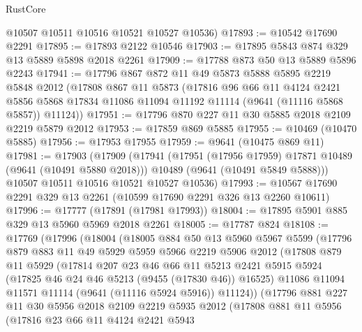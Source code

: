 \begin{lexlean}{RustCore}
\begin{coremodule}
      @10507
      @10511
      @10516
      @10521
      @10527
      @10536)
@17893 := @10542 @17690 @2291
@17895 := @17893 @2122 @10546
@17903 := @17895 @5843 @874 @329 @13 @5889 @5898 @2018 @2261
@17909 := @17788 @873 @50 @13 @5889 @5896 @2243
@17941 := @17796
    @867
    @872
    @11
    @49
    @5873
    @5888
    @5895
    @2219
    @5848
    @2012
    (@17808
      @867
      @11
      @5873
      (@17816
        @96
        @66
        @11
        @4124
        @2421
        @5856
        @5868
        @17834
        @11086
        @11094
        @11192
        @11114
        (@9641 (@11116 @5868 @5857))
        @11124))
@17951 := @17796 @870 @227 @11 @30 @5885 @2018 @2109 @2219 @5879 @2012
@17953 := @17859 @869 @5885
@17955 := @10469 (@10470 @5885)
@17956 := @17953 @17955
@17959 := @9641 (@10475 @869 @11)
@17981 := @17903
    (@17909
      (@17941
        (@17951 (@17956 @17959) @17871 @10489 (@9641 (@10491 @5880 @2018)))
        @10489
        (@9641 (@10491 @5849 @5888)))
      @10507
      @10511
      @10516
      @10521
      @10527
      @10536)
@17993 := @10567 @17690 @2291 @329 @13 @2261 (@10599 @17690 @2291 @326 @13 @2260 @10611)
@17996 := @17777 (@17891 (@17981 @17993))
@18004 := @17895 @5901 @885 @329 @13 @5960 @5969 @2018 @2261
@18005 := @17787 @824
@18108 := @17769
    (@17996
      (@18004
        (@18005
          @884
          @50
          @13
          @5960
          @5967
          @5599
          (@17796
            @879
            @883
            @11
            @49
            @5929
            @5959
            @5966
            @2219
            @5906
            @2012
            (@17808
              @879
              @11
              @5929
              (@17814
                @207
                @23
                @46
                @66
                @11
                @5213
                @2421
                @5915
                @5924
                (@17825 @46 @24 @46 @5213 (@9455 (@17830 @46)) @16525)
                @11086
                @11094
                @11571
                @11114
                (@9641 (@11116 @5924 @5916))
                @11124))
            (@17796
              @881
              @227
              @11
              @30
              @5956
              @2018
              @2109
              @2219
              @5935
              @2012
              (@17808
                @881
                @11
                @5956
                (@17816
                  @23
                  @66
                  @11
                  @4124
                  @2421
                  @5943

\end{coremodule}
\end{lexlean}
